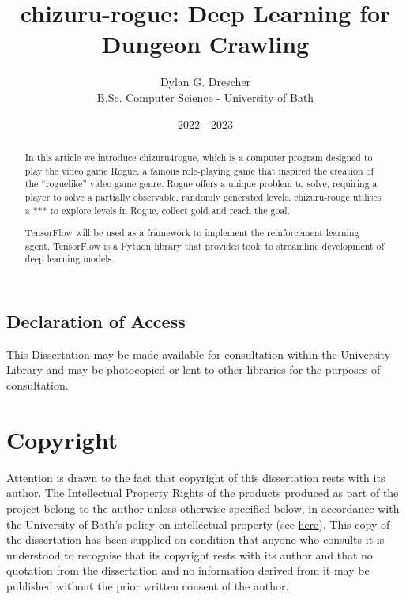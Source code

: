 \documentclass[11pt,a4paper]{article}
\begin{document}
    \title{chizuru-rogue: Deep Learning for Dungeon Crawling}
    \author{Dylan G. Drescher \\[1ex] B.Sc. Computer Science - University of Bath}
    \date{2022 - 2023}
    \maketitle

    \begin{abstract}
        In this article we introduce chizuru4rogue, which is a computer program designed to play the video game Rogue, a famous role-playing game that inspired the creation of the ``roguelike'' video game genre. Rogue offers a unique problem to solve, requiring a player to solve a partially observable, randomly generated levels. chizuru-rouge utilises a *** to explore levels in Rogue, collect gold and reach the goal.

        TensorFlow will be used as a framework to implement the reinforcement learning agent. TensorFlow is a Python library that provides tools to streamline development of deep learning models.
    \end{abstract}

    \setcounter{page}{0}
    \thispagestyle{empty}

    \newpage

    \begin{center}
        \section*{Declaration of Access}

        This Dissertation may be made available for consultation within the University Library and may be photocopied or lent to other libraries for the purposes of consultation.
    \end{center}

    \newpage

    \section*{Copyright}
    Attention is drawn to the fact that copyright of this dissertation rests with its author. The Intellectual Property Rights of the products produced as part of the project belong to the author unless otherwise specified below, in accordance with the University of Bath's policy on intellectual property (see \href{https://www.bath.ac.uk/publications/university-ordinances/attachments/Ordinances_1_October_2020.pdf}{here}). This copy of the dissertation has been supplied on condition that anyone who consults it is understood to recognise that its copyright rests with its author and that no quotation from the dissertation and no information derived from it may be published without the prior written consent of the author.
\end{document}
